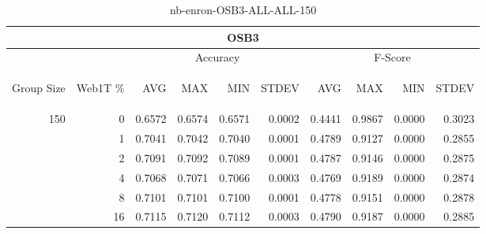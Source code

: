 \begin{center}
\begin{table}[htbp]
\begin{tabular}{ | r | r | r | r | r | r | r | r | r | r |}
\hline
\multicolumn{10}{|c|}{OSB3}\\
\hline
 & & \multicolumn{4}{|c|}{Accuracy} & \multicolumn{4}{|c|}{F-Score}\\ \cline{3-10}
\begin{sideways}Group Size\end{sideways} & \begin{sideways}Web1T \%\end{sideways} & \begin{sideways}AVG\end{sideways} & \begin{sideways}MAX\end{sideways} & \begin{sideways}MIN\end{sideways} & \begin{sideways}STDEV\end{sideways} & \begin{sideways}AVG\end{sideways} & \begin{sideways}MAX\end{sideways} & \begin{sideways}MIN\end{sideways} & \begin{sideways}STDEV\end{sideways}\\
\hline
\multirow{6}{*}{150}
 & 0 & 0.6572 & 0.6574 & 0.6571 & 0.0002 & 0.4441 & 0.9867 & 0.0000 & 0.3023\\ \cline{2-10}
 & 1 & 0.7041 & 0.7042 & 0.7040 & 0.0001 & 0.4789 & 0.9127 & 0.0000 & 0.2855\\ \cline{2-10}
 & 2 & 0.7091 & 0.7092 & 0.7089 & 0.0001 & 0.4787 & 0.9146 & 0.0000 & 0.2875\\ \cline{2-10}
 & 4 & 0.7068 & 0.7071 & 0.7066 & 0.0003 & 0.4769 & 0.9189 & 0.0000 & 0.2874\\ \cline{2-10}
 & 8 & 0.7101 & 0.7101 & 0.7100 & 0.0001 & 0.4778 & 0.9151 & 0.0000 & 0.2878\\ \cline{2-10}
 & 16 & 0.7115 & 0.7120 & 0.7112 & 0.0003 & 0.4790 & 0.9187 & 0.0000 & 0.2885\\ \cline{2-10}
\hline
\end{tabular}
\caption{nb-enron-OSB3-ALL-ALL-150}
\end{table}
\end{center}

